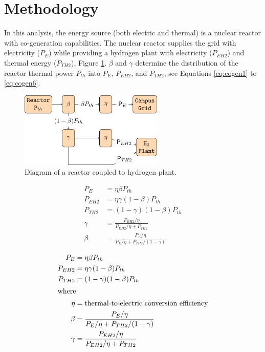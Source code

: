 \documentclass[11pt,letterpaper]{article}
\begin{document}
\section{Methodology}
\label{sec:metho}

In this analysis, the energy source (both electric and thermal) is a nuclear reactor with co-generation capabilities.
The nuclear reactor supplies the grid with electricity ($P_E$) while providing a hydrogen plant with electricity ($P_{EH2}$) and thermal energy ($P_{TH2}$), Figure \ref{fig:cogen}.
$\beta$ and $\gamma$ determine the distribution of the reactor thermal power $P_{th}$ into $P_E$, $P_{EH2}$, and $P_{TH2}$, see Equations \ref{eq:cogen1} to \ref{eq:cogen6}.

\begin{figure}[htbp!]
	\centering
	\includegraphics[height=3.6cm]{figures/hte-figure0.png}
	\hfill
	\caption{Diagram of a reactor coupled to hydrogen plant.}
	\label{fig:cogen}
\end{figure}

\begin{equation}
\begin{split}
	P_{E} &= \eta \beta P_{th}
	\\
	P_{EH2} &= \eta \gamma (1-\beta) P_{th}
	\\
	P_{TH2} &= (1-\gamma) (1-\beta) P_{th}
	\\
	\gamma &= \frac{P_{EH2} / \eta}{P_{EH2} / \eta + P_{TH2}}
	\\
	\beta &= \frac{P_{E} / \eta}{P_{E} / \eta + P_{TH2}/(1-\gamma)}.
\end{split}
\label{eq:hydro}
\end{equation}

\begin{align}
	P_{E} &= \eta \beta P_{th} \\
	\label{eq:cogen1}
	P_{EH2} &= \eta \gamma (1-\beta) P_{th}\\
	\label{eq:cogen2}
	P_{TH2} &= (1-\gamma) (1-\beta) P_{th}\\
	\label{eq:cogen3}
	\intertext{where}
    \eta &= \mbox{thermal-to-electric conversion efficiency} \\
	\label{eq:cogen4}
	\beta &= \frac{P_{E} / \eta}{P_{E} / \eta + P_{TH2}/(1-\gamma)}\\
	\label{eq:cogen5}
	\gamma &= \frac{P_{EH2} / \eta}{P_{EH2} / \eta + P_{TH2}}\\
	\label{eq:cogen6}
\end{align}
\end{document}
